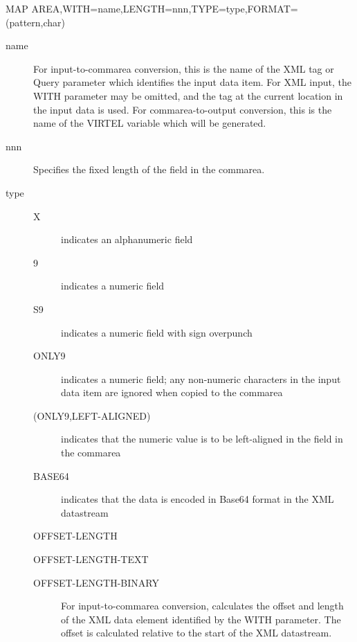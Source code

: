 \documentclass[letterpaper,10pt,english]{sphinxmanual}
\begin{document}
\begin{sphinxVerbatim}[commandchars=\\\{\}]
MAP\PYGZdl{} AREA,WITH=\PYGZsq{}name\PYGZsq{},LENGTH=nnn,TYPE=type,FORMAT=(\PYGZsq{}pattern\PYGZsq{},char)
\end{sphinxVerbatim}
\begin{description}
\item[{name}] \leavevmode
For input-to-commarea conversion, this is the name of the XML tag or Query parameter which identifies the input data item. For XML input, the WITH parameter may be omitted, and the tag at the current location in the input data is used. For commarea-to-output conversion, this is the name of the VIRTEL variable which will be generated.

\item[{nnn}] \leavevmode
Specifies the fixed length of the field in the commarea.

\item[{type}] \leavevmode\begin{description}
\item[{X}] \leavevmode
indicates an alphanumeric field

\item[{9}] \leavevmode
indicates a numeric field

\item[{S9}] \leavevmode
indicates a numeric field with sign overpunch

\item[{ONLY9}] \leavevmode
indicates a numeric field; any non-numeric characters in the input data item are ignored when copied to the commarea

\item[{(ONLY9,LEFT-ALIGNED)}] \leavevmode
indicates that the numeric value is to be left-aligned in the field in the commarea

\item[{BASE64}] \leavevmode
indicates that the data is encoded in Base64 format in the XML datastream

\end{description}

OFFSET-LENGTH

OFFSET-LENGTH-TEXT
\begin{description}
\item[{OFFSET-LENGTH-BINARY}] \leavevmode
For input-to-commarea conversion, calculates the offset and length of the XML data element identified by the WITH parameter. The offset is calculated relative to the start of the XML datastream.


\end{description}
\end{description}
\end{document}
